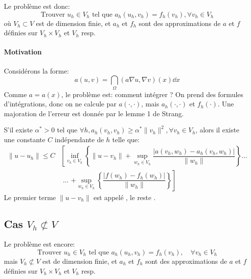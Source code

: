 Le problème est donc:
\begin{equation}
\text{Trouver } u_h\in V_h \text{ tel que } a_h(u_h,v_h) = f_h(v_h), \forall v_h\in V_h
\end{equation}
où $V_h\subset V$ est de dimension finie, et $a_h$ et $f_h$ sont des approximations
de $a$ et $f$ définies sur $V_h\times V_h$ et $V_h$ resp.
\medskip
{}
\medskip
\paragraph{Motivation}
Considérons la forme:
\begin{equation}a(u,v)=\dint_\Omega (a\nabla u,\nabla v)(x)\dd x\end{equation}
Comme $a=a(x)$, le problème est: comment intégrer ?
On prend des formules d'intégrations, donc on ne calcule par $a(\cdot,\cdot)$,
mais $a_h(\cdot,\cdot)$ et $f_h(\cdot)$.
\medskip
Une majoration de l'erreur est donnée par le lemme 1 de Strang.

\begin{lemme}
S'il existe $\alpha^*>0$ tel que $\forall h, a_h(v_h,v_h)\ge\alpha^*\|v_h\|^2, \forall v_h\in V_h$,
alors il existe une constante $C$ indépendante de $h$ telle que:
\begin{equation}
\begin{aligned}
\|u-u_h\|\le C &\left[
\inf_{v_h\in V_h} \left\{ \|u-v_h\| + \sup_{w_h\in V_h} \dfrac{|a(v_h,w_h)-a_h(v_h,w_h)|}{\|w_h\|}\right\} \textbf{...}\right.\\
& \textbf{ ... }\left. +\sup_{w_h\in V_h}\left\{\dfrac{|f(w_h)-f_h(w_h)|}{\|w_h\|}\right\}
\right]
\end{aligned}
\end{equation}
Le premier terme $ \|u-v_h\|$ est appelé ,
le reste .
\end{lemme}

\medskip
\subsection{Cas $V_h\not\subset V$}
Le problème est encore:
\begin{equation}
\text{Trouver } u_h\in V_h \text{ tel que } a_h(u_h,v_h) = f_h(v_h),\quad \forall v_h\in V_h
\end{equation}
mais $V_h\not\subset V$ est de dimension finie, et $a_h$ et $f_h$ sont des approximations
de $a$ et $f$ définies sur $V_h\times V_h$ et $V_h$ resp.

